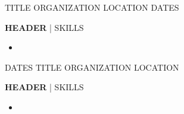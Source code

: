 
\begin{cventries}
	\cventry
	{TITLE} %
	{ORGANIZATION} %
	{LOCATION} %
	{DATES} %
	{
		\begin{cvitems} %
			\item {\textbf{HEADER} | {\color{awesome}SKILLS}
				\begin{itemize}[noitemsep,wide=0pt, leftmargin=\dimexpr{} + 2\relax]
					\item[\textbullet]{}
				\end{itemize}}
		\end{cvitems}
	}
	\cventry
	{DATES} %
	{TITLE} %
	{ORGANIZATION} %
	{LOCATION} %
	{
		\begin{cvitems} %
			\item {\textbf{HEADER} | {\color{awesome}SKILLS}
				\begin{itemize}[noitemsep,wide=0pt, leftmargin=\dimexpr{} + 2\relax]
					\item[\textbullet]{}
				\end{itemize}}
		\end{cvitems}
	}
\end{cventries}
